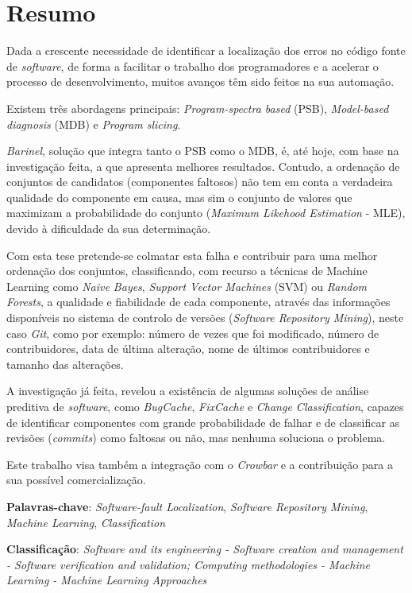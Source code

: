 \chapter*{Resumo}

Dada a crescente necessidade de identificar a localização dos erros no código fonte de \emph{software}, de forma a facilitar o trabalho dos programadores e a acelerar o processo de desenvolvimento, muitos avanços têm sido feitos na sua automação.

Existem três abordagens principais: \emph{Program-spectra based} (PSB), \emph{Model-based diagnosis} (MDB) e \emph{Program slicing}.

\emph{Barinel}, solução que integra tanto o PSB como o MDB, é, até hoje, com base na investigação feita, a que apresenta melhores resultados. Contudo, a ordenação de conjuntos de candidatos (componentes faltosos) não tem em conta a verdadeira qualidade do componente em causa, mas sim o conjunto de valores que maximizam a probabilidade do conjunto (\emph{Maximum Likehood Estimation} - MLE), devido à dificuldade da sua determinação.

Com esta tese pretende-se colmatar esta falha e contribuir para uma melhor ordenação dos conjuntos, classificando, com recurso a técnicas de Machine Learning como \emph{Naive Bayes}, \emph{Support Vector Machines} (SVM) ou \emph{Random Forests}, a qualidade e fiabilidade de cada componente, através das informações disponíveis no sistema de controlo de versões (\emph{Software Repository Mining}), neste caso \emph{Git}, como por exemplo: número de vezes que foi modificado, número de contribuidores, data de última alteração, nome de últimos contribuidores e tamanho das alterações.

A investigação já feita, revelou a existência de algumas soluções de análise preditiva de \emph{software}, como \emph{BugCache}, \emph{FixCache} e \emph{Change Classification}, capazes de identificar componentes com grande probabilidade de falhar e de classificar as revisões (\emph{commits}) como faltosas ou não, mas nenhuma soluciona o problema.

Este trabalho visa também a integração com o \emph{Crowbar} e a contribuição para a sua possível comercialização.

\vspace*{10mm}\noindent

\textbf{Palavras-chave}: \emph{Software-fault Localization}, \emph{Software Repository Mining}, \emph{Machine Learning}, \emph{Classification}

\vspace*{5mm}\noindent

\textbf{Classificação}: \emph{Software and its engineering - Software creation and management - Software verification and validation; Computing methodologies - Machine Learning - Machine Learning Approaches}